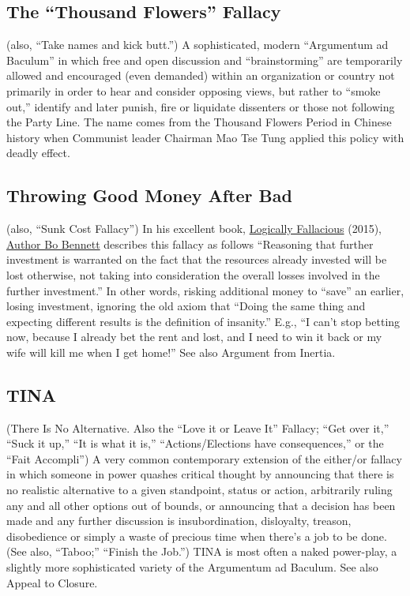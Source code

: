 \documentclass[10pt,a4paper,british]{article}
\begin{document}
\begin{multicols}{2}
	\subsection{The ``Thousand Flowers'' Fallacy} (also, ``Take names and kick
	butt.'') A sophisticated, modern ``Argumentum ad Baculum'' in which free
	and open discussion and ``brainstorming'' are temporarily allowed and
	encouraged (even demanded) within an organization or country not primarily
	in order to hear and consider opposing views, but rather to ``smoke out,''
	identify and later punish, fire or liquidate dissenters or those not
	following the Party Line. The name comes from the Thousand Flowers Period
	in Chinese history when Communist leader Chairman Mao Tse Tung applied this
	policy with deadly effect.

	\subsection{Throwing Good Money After Bad} (also, ``Sunk Cost Fallacy'') In
	his excellent book,
	\href{https://www.amazon.com/Logically-Fallacious-Ultimate-Collection-Fallacies/dp/1456624539/}{Logically
	Fallacious} (2015),
	\href{https://www.logicallyfallacious.com/tools/lp/Bo/LogicalFallacies/173/Sunk_Cost_Fallacy}{Author
	Bo Bennett} describes this fallacy as follows ``Reasoning that further
	investment is warranted on the fact that the resources already invested
	will be lost otherwise, not taking into consideration the overall losses
	involved in the further investment.''  In other words, risking additional
	money to ``save'' an earlier, losing investment, ignoring the old axiom
	that ``Doing the same thing and expecting different results is the
	definition of insanity.'' E.g., ``I can't stop betting now, because I
	already bet the rent and lost, and I need to win it back or my wife will
	kill me when I get home!'' See also Argument from Inertia.

	\subsection{TINA} (There Is No Alternative. Also the ``Love it or Leave
	It'' Fallacy; ``Get over it,'' ``Suck it up,'' ``It is what it is,''
	``Actions/Elections have consequences,'' or the ``Fait Accompli'') A very
	common contemporary extension of the either/or fallacy in which someone in
	power quashes critical thought by announcing that there is no realistic
	alternative to a given standpoint, status or action, arbitrarily ruling any
	and all other options out of bounds, or announcing that a decision has been
	made and any further discussion is insubordination, disloyalty, treason,
	disobedience or simply a waste of precious time when there's a job to be
	done. (See also, ``Taboo;'' ``Finish the Job.'')  TINA is most often a
	naked power{-}play, a slightly more sophisticated variety of the Argumentum
	ad Baculum.  See also Appeal to Closure.


\end{multicols}
\end{document}
